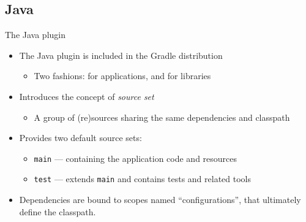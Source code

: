 \documentclass[presentation]{beamer}
\begin{document}
\subsection{Java}

\begin{frame}[fragile]{The Java plugin \cite{java-gradle-plugin}}
    \begin{itemize}
        \item The Java plugin is included in the Gradle distribution
        \begin{itemize}
            \item Two fashions: for applications, and for libraries
        \end{itemize}
        \item Introduces the concept of \textit{source set}
        \begin{itemize}
            \item A group of (re)sources sharing the same dependencies and classpath
        \end{itemize}
        \item Provides two default source sets:
        \begin{itemize}
            \item \texttt{main} --- containing the application code and resources
            \item \texttt{test} --- extends \texttt{main} and contains tests and related tools
        \end{itemize}
        \item Dependencies are bound to scopes named ``configurations'', that ultimately define the classpath.
    \end{itemize}
\end{frame}

\end{document}
